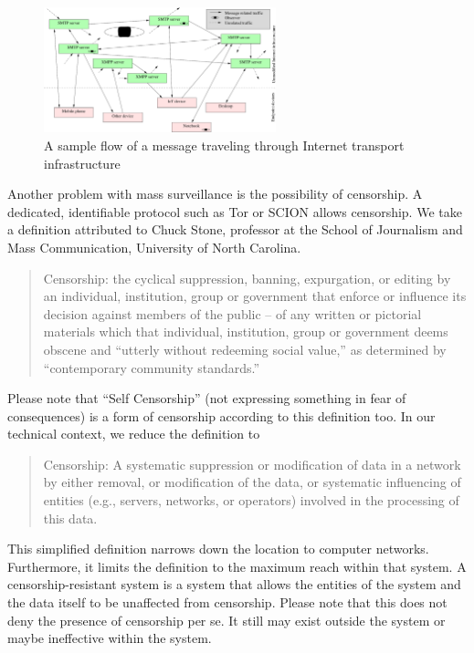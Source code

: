 \documentclass[acmsmall, screen, final, natbib=false]{acmart}
\begin{document}
	\begin{figure}[ht]
		\centering\includegraphics[width=0.6\textwidth]{internet_overview}
		\caption{A sample flow of a message traveling through Internet transport infrastructure}
		\label{fig:inet_overview}
	\end{figure}
	
	Another problem with mass surveillance is the possibility of censorship. A dedicated, identifiable protocol such as Tor\cite{tor-spec} or SCION\cite{perrig2017scion} allows censorship. We take a definition attributed to Chuck Stone, professor at the School of Journalism and Mass Communication, University of North Carolina. 
	
	\begin{quote}
		Censorship: the cyclical suppression, banning, expurgation, or editing by an individual, institution, group or government that enforce or influence its decision against members of the public -- of any written or pictorial materials which that individual, institution, group or government deems obscene and ``utterly without redeeming social value,'' as determined by ``contemporary community standards.''
	\end{quote}
	
	Please note that ``Self Censorship'' (not expressing something in fear of consequences)  is a form of censorship according to this definition too. In our technical context, we reduce the definition to
	\begin{quote}
		Censorship: A systematic suppression or modification of data in a network by either removal, or modification of the data, or systematic influencing of entities (e.g., servers, networks, or operators) involved in the processing of this data.
	\end{quote}
	
	This simplified definition narrows down the location to computer networks.  Furthermore, it limits the definition to the maximum reach within that system. A censorship-resistant system is a system that allows the entities of the system and the data itself to be unaffected from censorship. Please note that this does not deny the presence of censorship per se. It still may exist outside the system or maybe ineffective within the system. 
	
\end{document}
